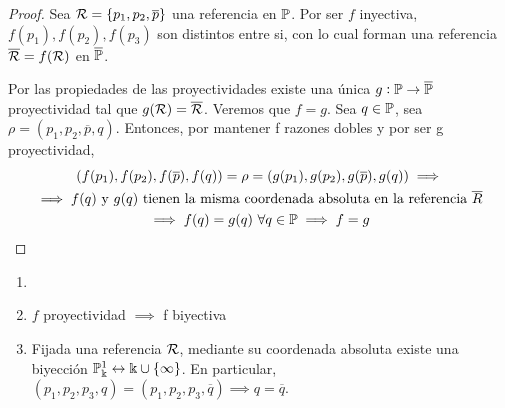 \begin{proof}
    Sea $\mathcal{R} = \{p_1, p_2, \overline{p}\}$  una referencia en $\mathbb{P}$. Por ser $f$ inyectiva,
    $f(p_1), f(p_2), f(p_3)$ son distintos entre si, con lo cual forman una referencia
    $\overline{\mathcal{R}} = f(\mathcal{R})$ en $\overline{\mathbb{P}}$.

    Por las propiedades de las proyectividades existe una única $g : \mathbb{P} \to \overline{\mathbb{P}}$
    proyectividad tal que $g(\mathcal{R}) = \overline{\mathcal{R}}$. Veremos que $f=g$. Sea $q \in \mathbb{P}$,
    sea $\rho = (p_1, p_2, \overline{p}, q)$. Entonces, por mantener f razones dobles y
    por ser g proyectividad,
    \begin{gather*}
    (f(p_1), f(p_2), f(\overline{p}), f(q)) = \rho = (g(p_1), g(p_2), g(\overline{p}), g(q))
    \implies \\
    \implies f(q) \text{ y } g(q) \text{ tienen la misma coordenada absoluta en la
    referencia } \overline{R} \\
    \implies f(q) = g(q) \ \forall q \in \mathbb{P} \implies f = g
    \end{gather*}
\end{proof}

\begin{obs}
    \begin{enumerate}
      \item[]
      \item $f$ proyectividad $\implies$ f biyectiva
      \item Fijada una referencia $\mathcal{R}$, mediante su coordenada absoluta existe una
      biyección $\mathbb{P}_\Bbbk^1 \leftrightarrow \Bbbk \cup \{\infty\}$. En particular, $(p_1, p_2, p_3,
      q) = (p_1, p_2, p_3, \overline{q}) \implies q = \overline{q}$.
    \end{enumerate}
\end{obs}

